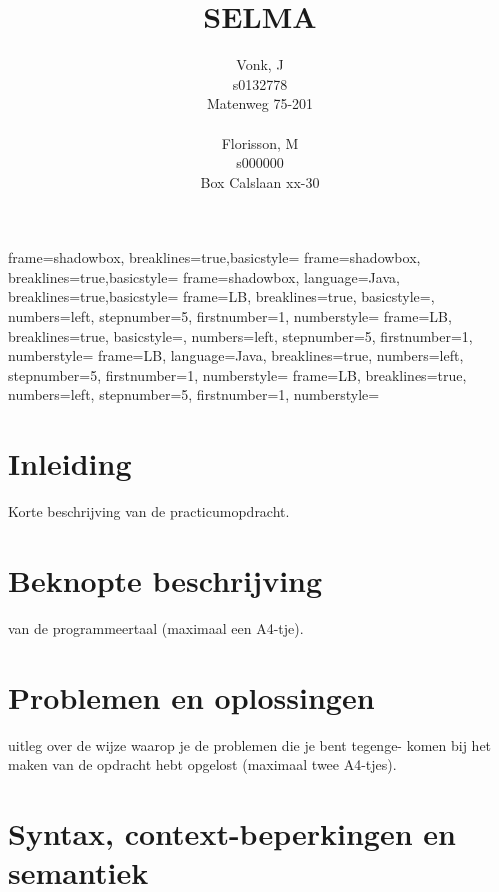 \documentclass[]{article}
\title{SELMA}
\author{ 
Vonk, J\\
s0132778\\
Matenweg 75-201\\
\\
Florisson, M\\
s000000\\
Box Calslaan xx-30}
\begin{document}
	{frame=shadowbox, breaklines=true,basicstyle=\footnotesize}
	{frame=shadowbox, breaklines=true,basicstyle=\small}
	{frame=shadowbox, language=Java, breaklines=true,basicstyle=\footnotesize}
	{frame=LB, breaklines=true, basicstyle=\scriptsize, numbers=left, stepnumber=5, firstnumber=1, numberstyle=\tiny}	
	{frame=LB, breaklines=true, basicstyle=\scriptsize, numbers=left, stepnumber=5, firstnumber=1, numberstyle=\tiny}	
	{frame=LB, language=Java, breaklines=true, numbers=left, stepnumber=5, firstnumber=1, numberstyle=\tiny}	
	{frame=LB, breaklines=true, numbers=left, stepnumber=5, firstnumber=1, numberstyle=\tiny}	

\newcommand{\todo}[1]{\marginpar{\fcolorbox{red}{yellow}{\textbf{#1}}}}



\begin{titlepage}
\maketitle 
\end{titlepage}
\tableofcontents{}

\newpage
\section{Inleiding}
Korte beschrijving van de practicumopdracht.

\newpage
\section{Beknopte beschrijving}
van de programmeertaal (maximaal een A4-tje).

\newpage
\section{Problemen en oplossingen}
uitleg over de wijze waarop je de problemen die je bent tegenge-
komen bij het maken van de opdracht hebt opgelost (maximaal twee A4-tjes).

\newpage
\section{Syntax, context-beperkingen en semantiek}

\end{document}
